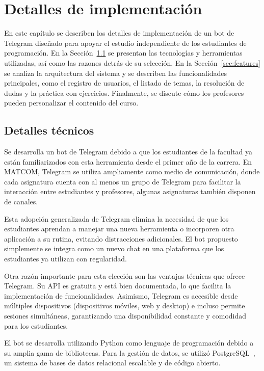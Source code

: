 \chapter{Detalles de implementación}\label{chapter:implementation}

En este capítulo se describen los detalles de implementación de un bot de Telegram diseñado para apoyar el estudio independiente de los estudiantes de programación. En la Sección~\ref{sec:technical-details} se presentan las tecnologías y herramientas utilizadas, así como las razones detrás de su selección. En la Sección~\ref{sec:features} se analiza la arquitectura del sistema y se describen las funcionalidades principales, como el registro de usuarios, el listado de temas, la resolución de dudas y la práctica con ejercicios. Finalmente, se discute cómo los profesores pueden personalizar el contenido del curso.

\section{Detalles técnicos}\label{sec:technical-details}

Se desarrolla un bot de Telegram debido a que los estudiantes de la facultad ya están familiarizados con esta herramienta desde el primer año de la carrera. En \mbox{MATCOM}, Telegram se utiliza ampliamente como medio de comunicación, donde cada asignatura cuenta con al menos un grupo de Telegram para facilitar la interacción entre estudiantes y profesores, algunas asignaturas también disponen de canales. 

Esta adopción generalizada de Telegram elimina la necesidad de que los estudiantes aprendan a manejar una nueva herramienta o incorporen otra aplicación a su rutina, evitando distracciones adicionales. El bot propuesto simplemente se integra como un nuevo chat en una plataforma que los estudiantes ya utilizan con regularidad.

Otra razón importante para esta elección son las ventajas técnicas que ofrece Telegram. Su API es gratuita y está bien documentada, lo que facilita la implementación de funcionalidades. Asimismo, Telegram es accesible desde múltiples dispositivos (dispositivos móviles, web y desktop) e incluso permite sesiones simultáneas, garantizando una disponibilidad constante y comodidad para los estudiantes.

El bot se desarrolla utilizando Python como lenguaje de programación debido a su amplia gama de bibliotecas. Para la gestión de datos, se utilizó PostgreSQL~\cite{postgresql}, un sistema de bases de datos relacional escalable y de código abierto.

